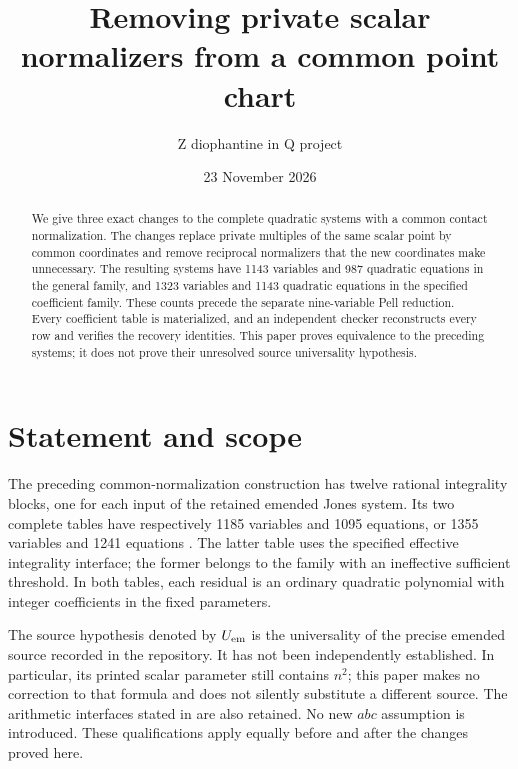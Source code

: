 \documentclass[11pt]{article}
\title{Removing private scalar normalizers from a common point chart}
\author{Z diophantine in Q project}
\date{23 November 2026}
\theoremstyle{remark}\newtheorem{remark}[theorem]{Remark}
\begin{document}
\maketitle
\begin{abstract}
We give three exact changes to the complete quadratic systems with a
common contact normalization. The changes replace private multiples of
the same scalar point by common coordinates and remove reciprocal
normalizers that the new coordinates make unnecessary. The resulting
systems have 1143 variables and 987 quadratic equations in the general
family, and 1323 variables and 1143 quadratic equations in the specified
coefficient family. These counts precede the separate nine-variable
Pell reduction. Every coefficient table is materialized, and an
independent checker reconstructs every row and verifies the recovery
identities. This paper proves equivalence to the preceding systems;
it does not prove their unresolved source universality hypothesis.
\end{abstract}

\section{Statement and scope}

The preceding common-normalization construction has twelve rational
integrality blocks, one for each input of the retained emended Jones
system. Its two complete tables have respectively 1185 variables and
1095 equations, or 1355 variables and 1241 equations
\cite{global}. The latter table uses the specified effective integrality
interface; the former belongs to the family with an ineffective
sufficient threshold. In both tables, each residual is an ordinary
quadratic polynomial with integer coefficients in the fixed parameters.

The source hypothesis denoted by \(U_{\rm em}\) is the universality of
the precise emended source recorded in the repository. It has not been
independently established. In particular, its printed scalar parameter
still contains \(n^2\); this paper makes no correction to that formula
and does not silently substitute a different source. The arithmetic
interfaces stated in \cite{global,scalar} are also retained. No new
\(abc\) assumption is introduced. These qualifications apply equally
before and after the changes proved here.
\end{document}
